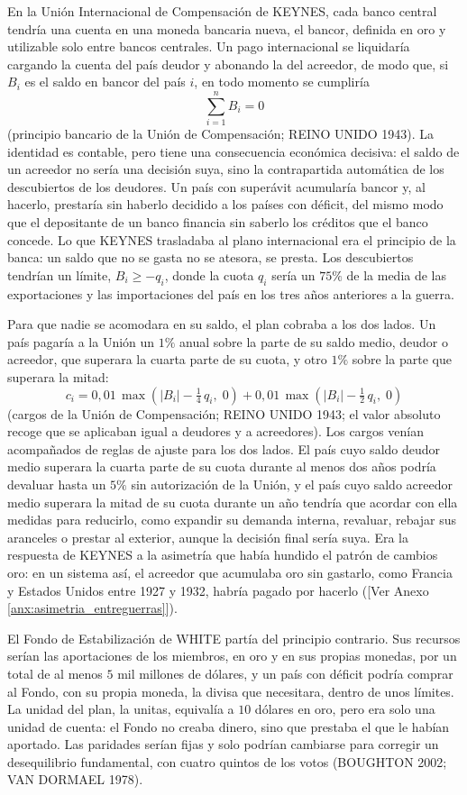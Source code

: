 \documentclass[10pt,a4paper]{article}
\newcommand{\authorfont}[1]{{\fontfamily{EBGaramond-TLF}\selectfont #1}}
\begin{document}
En la Unión Internacional de Compensación de KEYNES, cada banco central tendría una cuenta en una moneda bancaria nueva, el bancor, definida en oro y utilizable solo entre bancos centrales. Un pago internacional se liquidaría cargando la cuenta del país deudor y abonando la del acreedor, de modo que, si $B_i$ es el saldo en bancor del país $i$, en todo momento se cumpliría
$$\sum_{i=1}^{n} B_i = 0$$
(principio bancario de la Unión de Compensación; REINO UNIDO 1943). La identidad es contable, pero tiene una consecuencia económica decisiva: el saldo de un acreedor no sería una decisión suya, sino la contrapartida automática de los descubiertos de los deudores. Un país con superávit acumularía bancor y, al hacerlo, prestaría sin haberlo decidido a los países con déficit, del mismo modo que el depositante de un banco financia sin saberlo los créditos que el banco concede. Lo que KEYNES trasladaba al plano internacional era el principio de la banca: un saldo que no se gasta no se atesora, se presta. Los descubiertos tendrían un límite, $B_i\geq -q_i$, donde la cuota $q_i$ sería un $75\%$ de la media de las exportaciones y las importaciones del país en los tres años anteriores a la guerra.

Para que nadie se acomodara en su saldo, el plan cobraba a los dos lados. Un país pagaría a la Unión un $1\%$ anual sobre la parte de su saldo medio, deudor o acreedor, que superara la cuarta parte de su cuota, y otro $1\%$ sobre la parte que superara la mitad:
$$c_i = 0{,}01\,\max\left(|B_i|-\tfrac{1}{4}\,q_i,\;0\right) + 0{,}01\,\max\left(|B_i|-\tfrac{1}{2}\,q_i,\;0\right)$$
(cargos de la Unión de Compensación; REINO UNIDO 1943; el valor absoluto recoge que se aplicaban igual a deudores y a acreedores). Los cargos venían acompañados de reglas de ajuste para los dos lados. El país cuyo saldo deudor medio superara la cuarta parte de su cuota durante al menos dos años podría devaluar hasta un $5\%$ sin autorización de la Unión, y el país cuyo saldo acreedor medio superara la mitad de su cuota durante un año tendría que acordar con ella medidas para reducirlo, como expandir su demanda interna, revaluar, rebajar sus aranceles o prestar al exterior, aunque la decisión final sería suya. Era la respuesta de KEYNES a la asimetría que había hundido el patrón de cambios oro: en un sistema así, el acreedor que acumulaba oro sin gastarlo, como Francia y Estados Unidos entre 1927 y 1932, habría pagado por hacerlo ([\authorfont{Ver Anexo \ref{anx:asimetria_entreguerras}}]).

El Fondo de Estabilización de WHITE partía del principio contrario. Sus recursos serían las aportaciones de los miembros, en oro y en sus propias monedas, por un total de al menos $5$ mil millones de dólares, y un país con déficit podría comprar al Fondo, con su propia moneda, la divisa que necesitara, dentro de unos límites. La unidad del plan, la unitas, equivalía a $10$ dólares en oro, pero era solo una unidad de cuenta: el Fondo no creaba dinero, sino que prestaba el que le habían aportado. Las paridades serían fijas y solo podrían cambiarse para corregir un desequilibrio fundamental, con cuatro quintos de los votos (BOUGHTON 2002; VAN DORMAEL 1978).
\end{document}
